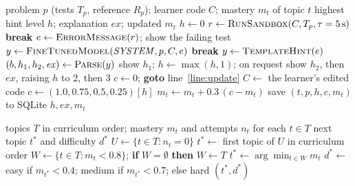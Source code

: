 \begin{algorithm}[t]
\caption{Guided Feedback loop}
\label{alg:feedback}
\begin{algorithmic}[1]
\Require problem $p$ (tests $T_p$, reference $R_p$); learner code $C$; mastery $m_t$ of topic $t$
\Ensure highest hint level $h$; explanation $\mathit{ex}$; updated $m_t$
\State $h \gets 0$
\Loop
    \State $r \gets \textsc{RunSandbox}(C, T_p, \tau = 5\,\text{s})$
     \textbf{break} \EndIf
    \State $e \gets \textsc{ErrorMessage}(r)$; show the failing test
     
         
            \State $y \gets \textsc{FineTunedModel}(\mathit{SYSTEM}, p, C, e)$ 
             \textbf{break} \EndIf
        \EndFor
         $y \gets \textsc{TemplateHint}(e)$ \EndIf
        \State $(b, h_1, h_2, \mathit{ex}) \gets \textsc{Parse}(y)$
        \State show $h_1$; $h \gets \max(h, 1)$; on request show $h_2$, then $\mathit{ex}$, raising $h$ to 2, then 3
    \EndIf
     $c \gets 0$; \textbf{goto} line~\ref{line:update} \EndIf
    \State $C \gets$ the learner's edited code
\EndLoop
\State $c \gets (1.0, 0.75, 0.5, 0.25)[h]$ 
\State $m_t \gets m_t + 0.3\,(c - m_t)$ \label{line:update}
\State save $(t, p, h, c, m_t)$ to SQLite
\State \Return $h, \mathit{ex}, m_t$
\end{algorithmic}
\end{algorithm}

\begin{algorithm}[t]
\caption{Next-topic and difficulty selection}
\label{alg:select}
\begin{algorithmic}[1]
\Require topics $T$ in curriculum order; mastery $m_t$ and attempts $n_t$ for each $t \in T$
\Ensure next topic $t^{*}$ and difficulty $d^{*}$
\State $U \gets \{t \in T : n_t = 0\}$
    \State $t^{*} \gets$ first topic of $U$ in curriculum order
\Else
    \State $W \gets \{t \in T : m_t < 0.8\}$; \textbf{if} $W = \emptyset$ \textbf{then} $W \gets T$
    \State $t^{*} \gets \arg\min_{t \in W} m_t$ 
\EndIf
\State $d^{*} \gets$ easy if $m_{t^{*}} < 0.4$; medium if $m_{t^{*}} < 0.7$; else hard
\State \Return $(t^{*}, d^{*})$
\end{algorithmic}
\end{algorithm}
